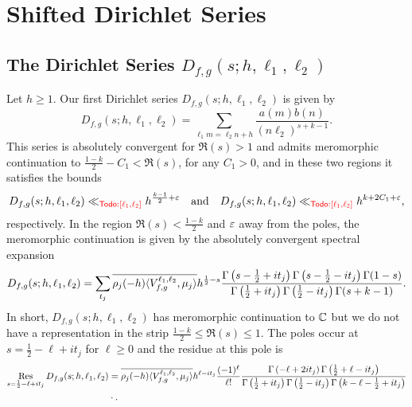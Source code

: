 \documentclass[12pt,reqno,oneside]{amsart}
\begin{document}
\section{Shifted Dirichlet Series}
  \subsection*{The Dirichlet Series \texorpdfstring{$D_{f,g}(s;h,\ell_{1},\ell_{2})$}{}}
    Let $h \ge 1$. Our first Dirichlet series $D_{f,g}(s;h,\ell_{1},\ell_{2})$ is given by
    \[
      D_{f,g}(s;h,\ell_{1},\ell_{2}) = \sum_{\ell_{1}m = \ell_{2}n+h}\frac{a(m)b(n)}{(n\ell_{2})^{s+k-1}}.
    \]
    This series is absolutely convergent for $\Re(s) > 1$ and admits meromorphic continuation to $\frac{1-k}{2}-C_{1} < \Re(s)$, for any $C_{1} > 0$, and in these two regions it satisfies the bounds
    \[
      D_{f,g}(s;h,\ell_{1},\ell_{2}) \ll_{\textcolor{red}{\sf Todo: [\ell_{1},\ell_{2}]}} h^{\frac{k-1}{2}+\varepsilon} \quad \text{and} \quad D_{f,g}(s;h,\ell_{1},\ell_{2}) \ll_{\textcolor{red}{\sf Todo: [\ell_{1},\ell_{2}]}} h^{k+2C_{1}+\varepsilon},
    \]
    respectively. In the region $\Re(s) < \frac{1-k}{2}$ and $\varepsilon$ away from the poles, the meromorphic continuation is given by the absolutely convergent spectral expansion
    \[
      D_{f,g}(s;h,\ell_{1},\ell_{2}) = \sum_{t_{j}}\overline{\rho_{j}(-h)\langle V_{f,g}^{\ell_{1},\ell_{2}},\mu_{j}\rangle}h^{\frac{1}{2}-s}\frac{\Gamma\left(s-\frac{1}{2}+it_{j}\right)\Gamma\left(s-\frac{1}{2}-it_{j}\right)\Gamma(1-s)}{\Gamma\left(\frac{1}{2}+it_{j}\right)\Gamma\left(\frac{1}{2}-it_{j}\right)\Gamma(s+k-1)}.
    \]
    In short, $D_{f,g}(s;h,\ell_{1},\ell_{2})$ has meromorphic continuation to $\mathbb{C}$ but we do not have a representation in the strip $\frac{1-k}{2} \le \Re(s) \le 1$. The poles occur at $s = \frac{1}{2}-\ell+it_{j}$ for $\ell \ge 0$ and the residue at this pole is
    \begin{align*}
      \operatorname*{\mathrm{Res}}_{s = \frac{1}{2}-\ell+it_{j}}D_{f,g}(s;h,\ell_{1},\ell_{2}) &= \overline{\rho_{j}(-h)\langle V_{f,g}^{\ell_{1},\ell_{2}},\mu_{j}\rangle}h^{\ell-it_{j}}\frac{(-1)^{\ell}}{\ell!}\frac{\Gamma\left(-\ell+2it_{j}\right)\Gamma\left(\frac{1}{2}+\ell-it_{j}\right)}{\Gamma\left(\frac{1}{2}+it_{j}\right)\Gamma\left(\frac{1}{2}-it_{j}\right)\Gamma\left(k-\ell-\frac{1}{2}+it_{j}\right)} \\
      &\cdot .
    \end{align*}
\end{document}
